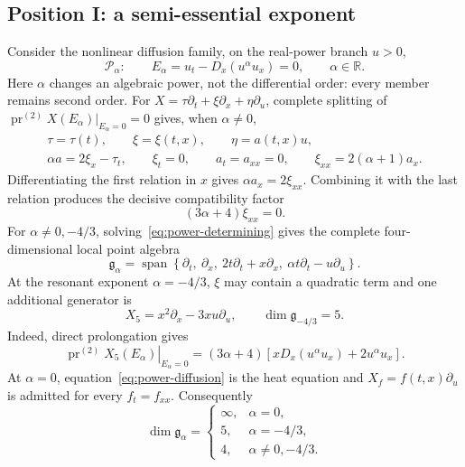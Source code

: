 \documentclass[11pt]{article}
\theoremstyle{definition}
\newcommand{\pr}{\operatorname{pr}}
\begin{document}
\subsection{Position I: a semi-essential exponent}
Consider the nonlinear diffusion family, on the real-power branch $u>0$,
\begin{equation}
 \mathcal P_\alpha:
 \qquad E_\alpha=u_t-D_x(u^\alpha u_x)=0,
 \qquad \alpha\in\mathbb R.
 \label{eq:power-diffusion}
\end{equation}
Here $\alpha$ changes an algebraic power, not the differential order: every
member remains second order. For
$X=\tau\partial_t+\xi\partial_x+\eta\partial_u$, complete splitting of
$\pr^{(2)}X(E_\alpha)|_{E_\alpha=0}=0$ gives, when $\alpha\ne0$,
\begin{equation}
 \begin{gathered}
 \tau=\tau(t),\qquad \xi=\xi(t,x),\qquad \eta=a(t,x)u,\\
 \alpha a=2\xi_x-\tau_t,\qquad
 \xi_t=0,\qquad a_t=a_{xx}=0,\qquad
 \xi_{xx}=2(\alpha+1)a_x.
 \end{gathered}
 \label{eq:power-determining}
\end{equation}
Differentiating the first relation in $x$ gives
$\alpha a_x=2\xi_{xx}$. Combining it with the last relation produces the
decisive compatibility factor
\begin{equation}
 \boxed{(3\alpha+4)\xi_{xx}=0.}
 \label{eq:power-resonance}
\end{equation}
For $\alpha\ne0,-4/3$, solving~\eqref{eq:power-determining} gives the complete
four-dimensional local point algebra
\begin{equation}
 \mathfrak g_\alpha
 =\operatorname{span}\left\{
 \partial_t,\ \partial_x,\ 2t\partial_t+x\partial_x,\
 \alpha t\partial_t-u\partial_u
 \right\}.
 \label{eq:power-generic-algebra}
\end{equation}
At the resonant exponent $\alpha=-4/3$, $\xi$ may contain a quadratic term
and one additional generator is
\begin{equation}
 X_5=x^2\partial_x-3xu\partial_u,
 \qquad \dim\mathfrak g_{-4/3}=5.
 \label{eq:power-extra-generator}
\end{equation}
Indeed, direct prolongation gives
\[
 \left.\pr^{(2)}X_5(E_\alpha)\right|_{E_\alpha=0}
 =(3\alpha+4)\left[xD_x(u^\alpha u_x)+2u^\alpha u_x\right].
\]
At $\alpha=0$, equation~\eqref{eq:power-diffusion} is the heat equation and
$X_f=f(t,x)\partial_u$ is admitted for every $f_t=f_{xx}$. Consequently
\begin{equation}
 \dim\mathfrak g_\alpha=
 \begin{cases}
  \infty,&\alpha=0,\\
  5,&\alpha=-4/3,\\
  4,&\alpha\ne0,-4/3.
 \end{cases}
 \label{eq:power-dimension-table}
\end{equation}
\end{document}

